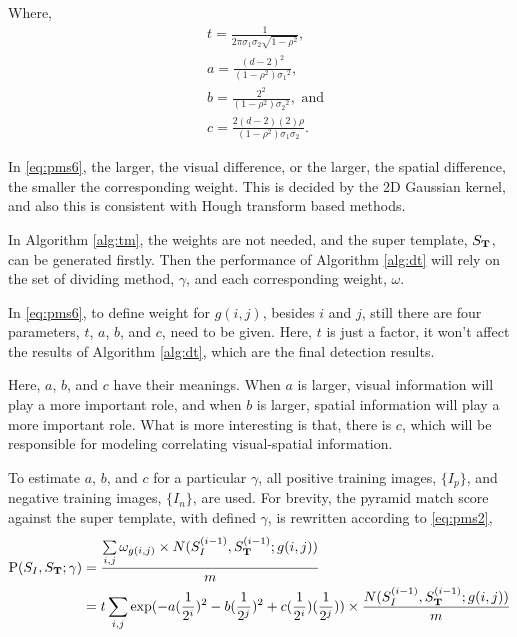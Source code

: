 Where,
\[\begin{aligned}
&t= \frac 1 {2 \pi \sigma_1 \sigma_2 \sqrt{1-\rho^2} } , \\
&a= \frac {(d-2)^2  }{(1-\rho^2){\sigma_1}^2},\\
&b= \frac{2^2 }{(1-\rho^2){\sigma_2}^2 },\mbox{ and}\\
&c= \frac{2 (d-2) (2)  \rho  }{(1-\rho^2){\sigma_1}{\sigma_2} }.
\end{aligned}
\]

In \ref{eq:pms6}, the larger, the visual difference, or the larger, the spatial difference, the smaller the corresponding weight. This is decided by the 2D Gaussian kernel, and also this is consistent with Hough transform based methods.

In Algorithm \ref{alg:tm}, the weights are not needed, and the super template, $S_{\bf T}$, can be generated firstly. Then the performance of Algorithm \ref{alg:dt} will rely on the set of dividing method, $\gamma$, and each corresponding weight, $\omega$.


In \ref{eq:pms6}, to define weight for $g(i,j)$, besides $i$ and $j$, still there are four parameters, $t$, $a$, $b$, and $c$, need to be given. Here, $t$ is just a factor, it won't affect the results of Algorithm \ref{alg:dt}, which are the final detection results.

Here, $a$, $b$, and $c$ have their meanings. When $a$ is larger, visual information will play a more important role, and when $b$ is larger, spatial information will play a more important role. What is more interesting is that, there is $c$, which will be responsible for modeling correlating visual-spatial information.

To estimate $a$, $b$, and $c$ for a particular $\gamma$, all positive training images, $\{I_p\}$, and negative training images, $\{I_n\}$, are used. For brevity, the pyramid match score against the super template, with defined $\gamma$, is rewritten according to \ref{eq:pms2},
\begin{equation}
\begin{aligned}
{\rm P}(S_{I},S_{\bf{T}};\gamma)&=\frac{ \sum\limits_{i,j}{{\omega}_{g(i,j)}\times N(S_I^{(i-1)},S_{\bf T}^{(i-1)}; g(i,j)) }}{m}\\
&=t \sum\limits_{i,j}{  \exp(-a (\frac 1 {2^i})^2 - b (\frac 1 {2^j})^2 + c (\frac 1 {2^i}) (\frac 1 {2^j}))  \times \frac{ N(S_I^{(i-1)},S_{\bf T}^{(i-1)}; g(i,j))} m }\\
\end{aligned}
\label{eq:pms7}
\end{equation}

